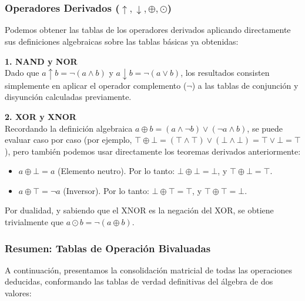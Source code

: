 \subsubsection{Operadores Derivados ($\uparrow, \downarrow, \oplus, \odot$)}
Podemos obtener las tablas de los operadores derivados aplicando directamente sus definiciones algebraicas sobre las tablas básicas ya obtenidas:

\textbf{1. NAND y NOR} \\
Dado que $a \uparrow b = \neg(a \wedge b)$ y $a \downarrow b = \neg(a \vee b)$, los resultados consisten simplemente en aplicar el operador complemento ($\neg$) a las tablas de conjunción y disyunción calculadas previamente.

\textbf{2. XOR y XNOR} \\
Recordando la definición algebraica $a \oplus b = (a \wedge \neg b) \vee (\neg a \wedge b)$, se puede evaluar caso por caso (por ejemplo, $\top \oplus \bot = (\top \wedge \top) \vee (\bot \wedge \bot) = \top \vee \bot = \top$), pero también podemos usar directamente los teoremas derivados anteriormente:
\begin{itemize}
    \item $a \oplus \bot = a$ (Elemento neutro). Por lo tanto: $\bot \oplus \bot = \bot$, y $\top \oplus \bot = \top$.
    \item $a \oplus \top = \neg a$ (Inversor). Por lo tanto: $\bot \oplus \top = \top$, y $\top \oplus \top = \bot$.
\end{itemize}
Por dualidad, y sabiendo que el XNOR es la negación del XOR, se obtiene trivialmente que $a \odot b = \neg(a \oplus b)$.

\subsubsection{Resumen: Tablas de Operación Bivaluadas}
A continuación, presentamos la consolidación matricial de todas las operaciones deducidas, conformando las tablas de verdad definitivas del álgebra de dos valores:

